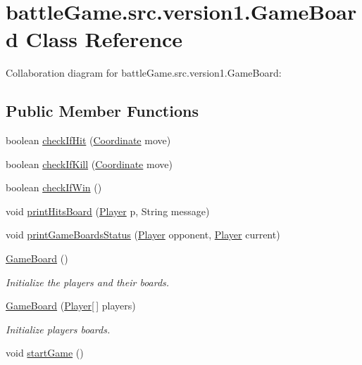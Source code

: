 \hypertarget{classbattleGame_1_1src_1_1version1_1_1GameBoard}{}\section{battle\+Game.\+src.\+version1.\+Game\+Board Class Reference}
\label{classbattleGame_1_1src_1_1version1_1_1GameBoard}


Collaboration diagram for battle\+Game.\+src.\+version1.\+Game\+Board\+:
\subsection*{Public Member Functions}
\begin{DoxyCompactItemize}
\item 
boolean \hyperlink{classbattleGame_1_1src_1_1version1_1_1GameBoard_af8e480a108a24bc1e9817d05c7bb5e49}{check\+If\+Hit} (\hyperlink{classbattleGame_1_1src_1_1version1_1_1Coordinate}{Coordinate} move)
\item 
boolean \hyperlink{classbattleGame_1_1src_1_1version1_1_1GameBoard_ae13f80ef7c0b8984b6044b09e3f5dc3e}{check\+If\+Kill} (\hyperlink{classbattleGame_1_1src_1_1version1_1_1Coordinate}{Coordinate} move)
\item 
boolean \hyperlink{classbattleGame_1_1src_1_1version1_1_1GameBoard_a65c3bcf30e0f692059d565d3058d5f3b}{check\+If\+Win} ()
\item 
void \hyperlink{classbattleGame_1_1src_1_1version1_1_1GameBoard_a643ab9bbd69b5e2d0aa96b8d6e4e7ca3}{print\+Hits\+Board} (\hyperlink{classbattleGame_1_1src_1_1version1_1_1Player}{Player} p, String message)
\item 
void \hyperlink{classbattleGame_1_1src_1_1version1_1_1GameBoard_a0c20deb3c3ee7702e016f888246c56f4}{print\+Game\+Boards\+Status} (\hyperlink{classbattleGame_1_1src_1_1version1_1_1Player}{Player} opponent, \hyperlink{classbattleGame_1_1src_1_1version1_1_1Player}{Player} current)
\item 
\hyperlink{classbattleGame_1_1src_1_1version1_1_1GameBoard_a40381843bbf9994a69c1976f6b0e9ad9}{Game\+Board} ()
\begin{DoxyCompactList}\small\item\em Initialize the players and their boards. \end{DoxyCompactList}\item 
\hyperlink{classbattleGame_1_1src_1_1version1_1_1GameBoard_ade21785d7182d3d74138eb78a48c3b68}{Game\+Board} (\hyperlink{classbattleGame_1_1src_1_1version1_1_1Player}{Player}\mbox{[}$\,$\mbox{]} players)
\begin{DoxyCompactList}\small\item\em Initialize players boards. \end{DoxyCompactList}\item 
void \hyperlink{classbattleGame_1_1src_1_1version1_1_1GameBoard_a7e774bf0b30921b723fbd4d00fb878f8}{start\+Game} ()
\end{DoxyCompactItemize}
